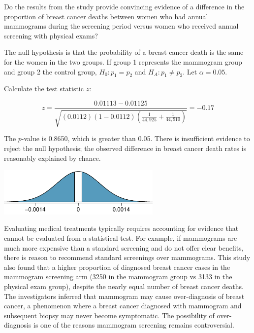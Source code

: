 \begin{example}{Do the results from the study provide convincing evidence of a difference in the proportion of breast cancer deaths between women who had annual mammograms during the screening period versus women who received annual screening with physical exams?}

\label{mammogramExProp}

The null hypothesis is that the probability of a breast cancer death is the same for the women in the two groups. If group 1 represents the mammogram group and group 2 the control group, $H_0: p_1 = p_2$ and $H_A: p_1 \neq p_2$.  Let $\alpha = 0.05$.

Calculate the test statistic $z$:

\[z = \dfrac{0.01113 - 0.01125}{\sqrt{(0.0112)(1-0.0112)\left(\frac{1}{44,925} + \frac{1}{44,910} \right)}} = -0.17\]	
	
The $p$-value is 0.8650, which is greater than 0.05. There is insufficient evidence to reject the null hypothesis; the observed difference in breast cancer death rates is reasonably explained by chance. 	
	
\begin{center}
	\includegraphics[width=0.6\textwidth]{ch_inference_for_props_oi_biostat/figures/mammograms/mammogramPValue}
\end{center}	
	
Evaluating medical treatments typically requires accounting for evidence that cannot be evaluated from a statistical test. For example, if mammograms are much more expensive than a standard screening and do not offer clear benefits, there is reason to recommend standard screenings over mammograms. This study also found that a higher proportion of diagnosed breast cancer cases in the mammogram screening arm (3250 in the mammogram group vs 3133 in the physical exam group), despite the nearly equal number of breast cancer deaths.  The investigators inferred that mammogram may cause over-diagnosis of breast cancer, a phenomenon where a breast cancer diagnosed with mammogram and subsequent biopsy may never become symptomatic. The possibility of over-diagnosis is one of the reasons mammogram screening remains controversial.

\end{example}

